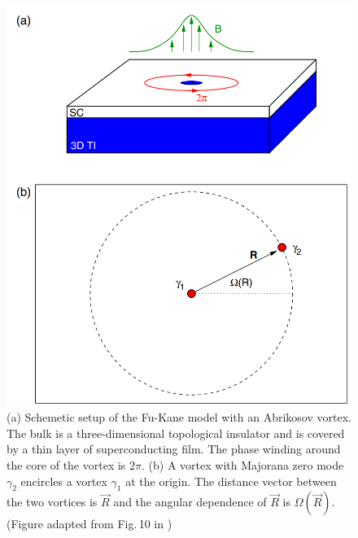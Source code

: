 \documentclass[11pt, oneside]{book}
\theoremstyle{break}
\theoremstyle{break}
\begin{document}
\begin{figure}[h]
  \centering
\includegraphics[scale=1]{2}
\caption{\small (a) Schemetic setup of the Fu-Kane model with an Abrikosov vortex. The bulk is a three-dimensional topological insulator and is covered by a thin layer of superconducting film. The phase winding around the core of the vortex is $2\pi$. (b) A vortex with Majorana zero mode $\gamma_2$ encircles a vortex $\gamma_1$ at the origin. The distance vector between the two vortices is $\vec{R}$ and the angular dependence of $\vec{R}$ is $\Omega(\vec{R})$. (Figure adapted from Fig.\,10 in \cite{Review})\normalsize}
\end{figure}
\end{document}
